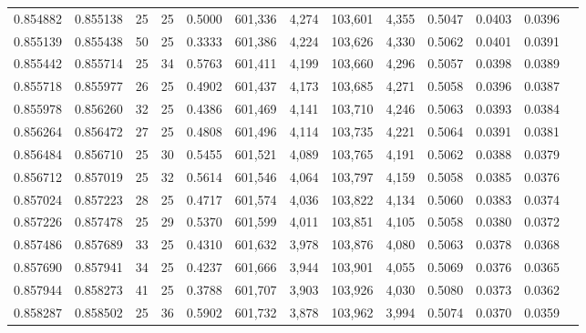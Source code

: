 \begin{tabular}{rrrrrrrrrrrrr}
0.854882 & 0.855138 &    25 &  25 &                                     0.5000 & 601,336 &   4,274 & 103,601 &   4,355 & 0.5047 & 0.0403 & 0.0396 \\
0.855139 & 0.855438 &    50 &  25 &                                     0.3333 & 601,386 &   4,224 & 103,626 &   4,330 & 0.5062 & 0.0401 & 0.0391 \\
0.855442 & 0.855714 &    25 &  34 &                                     0.5763 & 601,411 &   4,199 & 103,660 &   4,296 & 0.5057 & 0.0398 & 0.0389 \\
0.855718 & 0.855977 &    26 &  25 &                                     0.4902 & 601,437 &   4,173 & 103,685 &   4,271 & 0.5058 & 0.0396 & 0.0387 \\
0.855978 & 0.856260 &    32 &  25 &                                     0.4386 & 601,469 &   4,141 & 103,710 &   4,246 & 0.5063 & 0.0393 & 0.0384 \\
0.856264 & 0.856472 &    27 &  25 &                                     0.4808 & 601,496 &   4,114 & 103,735 &   4,221 & 0.5064 & 0.0391 & 0.0381 \\
0.856484 & 0.856710 &    25 &  30 &                                     0.5455 & 601,521 &   4,089 & 103,765 &   4,191 & 0.5062 & 0.0388 & 0.0379 \\
0.856712 & 0.857019 &    25 &  32 &                                     0.5614 & 601,546 &   4,064 & 103,797 &   4,159 & 0.5058 & 0.0385 & 0.0376 \\
0.857024 & 0.857223 &    28 &  25 &                                     0.4717 & 601,574 &   4,036 & 103,822 &   4,134 & 0.5060 & 0.0383 & 0.0374 \\
0.857226 & 0.857478 &    25 &  29 &                                     0.5370 & 601,599 &   4,011 & 103,851 &   4,105 & 0.5058 & 0.0380 & 0.0372 \\
0.857486 & 0.857689 &    33 &  25 &                                     0.4310 & 601,632 &   3,978 & 103,876 &   4,080 & 0.5063 & 0.0378 & 0.0368 \\
0.857690 & 0.857941 &    34 &  25 &                                     0.4237 & 601,666 &   3,944 & 103,901 &   4,055 & 0.5069 & 0.0376 & 0.0365 \\
0.857944 & 0.858273 &    41 &  25 &                                     0.3788 & 601,707 &   3,903 & 103,926 &   4,030 & 0.5080 & 0.0373 & 0.0362 \\
0.858287 & 0.858502 &    25 &  36 &                                     0.5902 & 601,732 &   3,878 & 103,962 &   3,994 & 0.5074 & 0.0370 & 0.0359 \\

\end{tabular}
